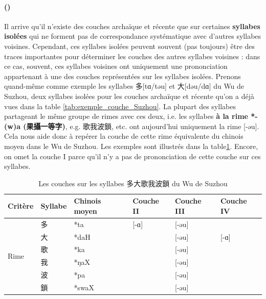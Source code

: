 \documentclass{scrbook}
\newcounter{c}[subsubsection]
\newcommand{\stpc}[1]{\stepcounter{#1}}
\newcommand{\difwenbai}{couches archaïque et récente\xspace}
\newcommand{\iso}{syllabes isolées\xspace}
\newcommand{\illustre}{Les exemples sont illustrés dans la table\xspace}
\newcommand{\termyyx}[1]{\textbf{#1}}
\begin{document}
\begin{sloppypar}
\stpc{c}\paragraph{()}
Il arrive qu'il n'existe des \difwenbai que sur certaines \textbf{\iso} qui ne forment pas de correspondance systématique avec d'autres syllabes voisines. Cependant, ces \iso peuvent souvent (pas toujours) être des traces importantes pour déterminer les couches des autres syllabes voisines : dans ce cas, souvent, ces syllabes voisines ont uniquement une prononciation appartenant à une des couches représentées sur les \iso. Prenons quand-même comme exemple les syllabes 多[tɑ/təu] et 大[dəu/dɑ] du Wu de Suzhou, deux \iso pour les \difwenbai qu'on a déjà vues dans la table \ref{tab:exemple_couche_Suzhou}. La plupart des syllabes partageant le même groupe de rimes avec ces deux, i.e. les syllabes \termyyx{à la rime *-(w)a (果攝一等字)}, e.g. 歌我波鎖, etc. ont aujourd'hui uniquement la rime [-əu]. Cela nous aide donc à repérer la couche de cette rime équivalente du chinois moyen dans le Wu de Suzhou. \illustre \ref{tab:exemple_couche_iso_Suzhou}. Encore, on omet la couche I parce qu'il n'y a pas de prononciation de cette couche sur ces syllabes.
\begin{table}[htbp]
  \centering
    \begin{tabular}{llllll}
    \toprule
    Critère & Syllabe & Chinois moyen  & Couche II & Couche III & Couche IV \\
    \midrule
    \multirow{6}[2]{*}{Rime} & 多     & *ta   & \multicolumn{1}{l}{[-ɑ]} & [-əu] &  \\
          & 大     & *daH  &       & [-əu] & \multicolumn{1}{l}{[-ɑ]} \\
          & 歌     & *ka   &       & [-əu] &  \\
          & 我     & *ŋaX  &       & [-əu] &  \\
          & 波     & *pa   &       & [-əu] &  \\
          & 鎖     & *swaX &       & [-əu] &  \\
    \bottomrule
    \end{tabular}%
  \caption{Les couches sur les syllabes 多大歌我波鎖 du Wu de Suzhou}
  \label{tab:exemple_couche_iso_Suzhou}%
\end{table}%



\end{sloppypar}
\end{document}
